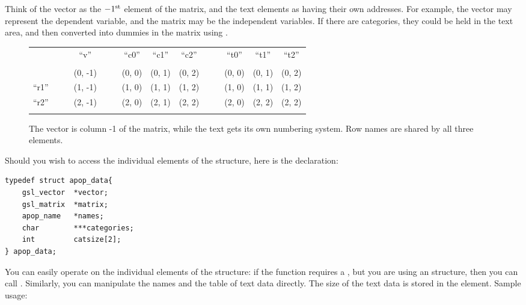 Think of the vector as the $-1^{\rm st}$ element of the matrix, and the 
text elements as having their own addresses. For example, the vector may
represent the dependent variable, and the matrix may be the independent
variables. If there are categories, they could be held in the text area,
and then converted into dummies in the matrix using
. 


\def\atouch{\phantom {.}}
\renewcommand\arraystretch{1.1}
\begin{figure}
\hspace {-0.5cm}
\begin{tabular}{lc|ccc|ccccc|cccc}
\hhline{~~~-~~---~~---}
        &&& \multicolumn{1}{|c|}{``v''}   &&& \multicolumn{1}{|c}{``c0''} & ``c1'' & \multicolumn{1}{c|}{``c2''}  &&& \multicolumn{1}{|c}{``t0''} & ``t1'' & \multicolumn{1}{c|}{``t2''}    \\\hhline{~~~-~~---~~---}
\atouch&\atouch&\atouch&\atouch&\atouch&\atouch&\atouch&\atouch&\atouch&\atouch&\atouch&\atouch&\atouch\\\hhline{-}
\multicolumn{1}{|c|}{``r0''}&&&(0, -1)   &&& (0, 0) & (0, 1) & (0, 2) &&& (0, 0) & (0, 1) & (0, 2)\\ 
\multicolumn{1}{|c|}{``r1''}&&&(1, -1)   &&& (1, 0) & (1, 1) & (1, 2) &&& (1, 0) & (1, 1) & (1, 2)\\
\multicolumn{1}{|c|}{``r2''}&\atouch&\atouch&(2, -1)   &\atouch&& (2, 0) & (2, 1) & (2, 2) &\atouch&\atouch& (2, 0) & (2, 2) & (2, 2)\\\hhline{-}
\end{tabular}
\caption{The vector is column -1 of the matrix, while the text gets its
own numbering system. Row names are shared by all three
elements.}
\label{datalayout}
\end{figure}

Should you wish to access the individual elements of the  structure, here is the declaration:

\begin{lstlisting}
typedef struct apop_data{
    gsl_vector  *vector;
    gsl_matrix  *matrix;
    apop_name   *names;
    char        ***categories;
    int         catsize[2];
} apop_data;
\end{lstlisting}



You can easily operate on the individual elements of the structure:
if the  function requires a
, but you are using an 
structure, then you can call
. Similarly, you
can
manipulate the names and the table of text data directly. The size of the text
data is stored in the  element. Sample usage:

